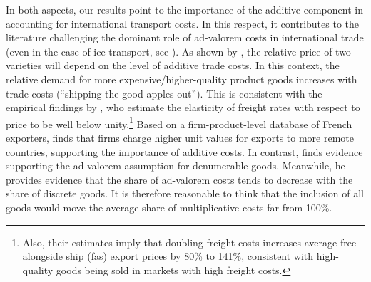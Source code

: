 \documentclass[a4paper,11pt]{article}
\begin{document}
\smallskip
In both aspects, our results point to the importance of the additive component in accounting for international transport costs.
In this respect, it contributes to the literature challenging the dominant role of ad-valorem costs in international trade (even in the case of ice transport, see \citealp{bosker2018ice}). As shown by \cite{alchian}, the relative price of two varieties will depend on the level of additive trade costs. In this context, the relative demand for more expensive/higher-quality product goods increases with trade costs (``shipping the good apples out''). This is consistent with the empirical findings by \cite{hummels_skiba}, who estimate the elasticity of freight rates with respect to price to be well below unity.\footnote{Also, their estimates imply that doubling freight costs increases average free alongside ship (fas) export prices by 80\% to 141\%, consistent with high-quality goods being sold in markets with high freight costs.}
Based on a firm-product-level database of French exporters, \cite{martin2012} finds that firms charge higher unit values for exports to more remote countries, supporting the importance of additive costs. In contrast, \cite{Lashkaripour_JIE2020} finds evidence supporting the ad-valorem assumption for denumerable goods. Meanwhile, he provides evidence that the share of ad-valorem costs tends to decrease with the share of discrete goods. It is therefore reasonable to think that the inclusion of all goods would move the average share of multiplicative costs far from 100\%.
\end{document}

